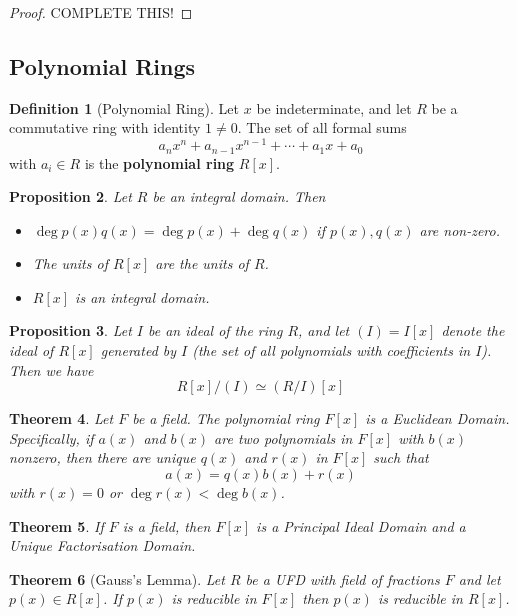 \documentclass[10pt, oneside, reqno]{amsart}
\theoremstyle{plain}%
\newtheorem{thm}{Theorem}[section]
\newtheorem{prop}[thm]{Proposition}
\theoremstyle{definition}
\newtheorem{defn}[thm]{Definition}
\theoremstyle{remark}
\begin{document}
\begin{proof}
	COMPLETE THIS!
\end{proof}

\subsection{Polynomial Rings} %
\label{sub:polynomial_rings}

\begin{defn}[Polynomial Ring]
	Let $x$ be indeterminate, and let $R$ be a commutative ring with identity $1 \neq 0$.  The set of all formal sums \[
		a_n x^n + a_{n-1} x^{n-1} + \cdots + a_1 x + a_0 
	\] with $a_i \in R$ is the \textbf{polynomial ring} $R[x]$.
\end{defn}

\begin{prop}
	Let $R$ be an integral domain.  Then
	\begin{itemize}
		\item $\deg p(x) q(x) = \deg p(x) + \deg q(x)$ if $p(x), q(x)$ are non-zero.
		\item The units of $R[x]$ are the units of $R$.
		\item $R[x]$ is an integral domain.
	\end{itemize}
\end{prop}

\begin{prop}
	Let $I$ be an ideal of the ring $R$, and let $(I) = I[x]$ denote the ideal of $R[x]$ generated by $I$ (the set of all polynomials with coefficients in $I$).  Then we have\[
		R[x]/(I) \simeq (R/I)[x]
	\] 
\end{prop}

\begin{thm}
	Let $F$ be a field.  The polynomial ring $F[x]$ is a Euclidean Domain.  Specifically, if $a(x)$ and $b(x)$  are two polynomials in $F[x]$ with $b(x)$ nonzero, then there are unique $q(x)$ and $r(x)$ in $F[x]$ such that \[
		a(x) = q(x) b(x) + r(x)
	\] with $r(x) = 0$ or $\deg r(x) < \deg b(x)$.
\end{thm}

\begin{thm}
	If $F$ is a field, then $F[x]$ is a Principal Ideal Domain and a Unique Factorisation Domain.
\end{thm}

\begin{thm}[Gauss's Lemma]
	Let $R$ be a UFD with field of fractions $F$ and let $p(x) \in R[x]$.  If $p(x)$ is reducible in $F[x]$ then $p(x)$ is reducible in $R[x]$.
\end{thm}
\end{document}
